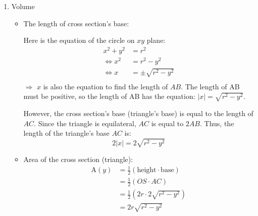 \documentclass[12pt]{article}
\begin{document}
\begin{enumerate}
\begin{tikzpicture}[tdplot_main_coords, scale =1]
        
        
    \end{tikzpicture}
    
    \item Volume \par
    \begin{itemize}
    \item The length of cross section's base: \par
    Here is the equation of the circle on $xy$ plane:
    \begin{align*}
        x^2+y^2&=r^2 \\
        \Longleftrightarrow
        x^2&=r^2-y^2 \\
        \Longleftrightarrow
        x&=\pm \sqrt{r^2-y^2}\\
    \end{align*}
    $\Longrightarrow$ $x$ is also the equation to find the length of $AB$. The length of AB must be positive, so the length of AB has the equation: $|x|=\sqrt{r^2-y^2}$.\par
    
    However, the cross section's base (triangle's base) is equal to the length of $AC$. Since the triangle is equilateral, $AC$ is equal to $2AB$. Thus, the length of the triangle's base $AC$ is: $$2|x|=2\sqrt{r^2-y^2}$$
    
    \item Area of the cross section (triangle):
    \begin{align*}
        \text{A}(y) &=\frac{1}{2}\left(\text{height}\cdot\text{base} \right)\\
        &=\frac{1}{2}\left(OS\cdot AC\right)\\
        &=\frac{1}{2}\left(2r\cdot 2\sqrt{r^2-y^2} \right)\\
        &= 2r\sqrt{r^2-y^2}\\
    \end{align*}
    

\end{itemize}
\end{enumerate}
\end{document}
